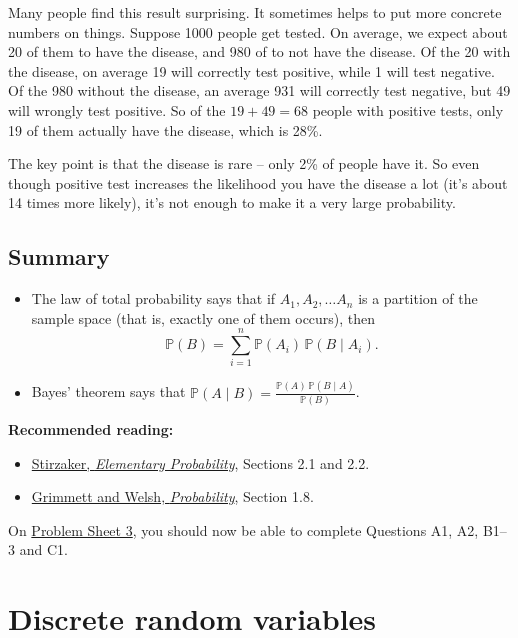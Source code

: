 \documentclass[
  a4paper,
]{book}
\providecommand{\tightlist}{%
  \setlength{\itemsep}{0pt}\setlength{\parskip}{0pt}}
\theoremstyle{definition}
\theoremstyle{definition}
\theoremstyle{definition}
\theoremstyle{definition}
\theoremstyle{remark}
\begin{document}
Many people find this result surprising. It sometimes helps to put more concrete numbers on things. Suppose 1000 people get tested. On average, we expect about 20 of them to have the disease, and 980 of to not have the disease. Of the 20 with the disease, on average 19 will correctly test positive, while 1 will test negative. Of the 980 without the disease, an average 931 will correctly test negative, but 49 will wrongly test positive. So of the \(19+49 = 68\) people with positive tests, only 19 of them actually have the disease, which is 28\%.

The key point is that the disease is rare -- only 2\% of people have it. So even though positive test increases the likelihood you have the disease a lot (it's about 14 times more likely), it's not enough to make it a very large probability.

\hypertarget{summary-L08}{%
\section*{Summary}\label{summary-L08}}

\begin{itemize}
\tightlist
\item
  The law of total probability says that if \(A_1, A_2, \dots A_n\) is a partition of the sample space (that is, exactly one of them occurs), then
  \[ \mathbb P(B) = \sum_{i=1}^n \mathbb P(A_i) \, \mathbb P(B \mid A_i) . \]
\item
  Bayes' theorem says that \({\displaystyle \mathbb P(A \mid B) = \frac{\mathbb P(A) \,\mathbb P(B \mid A)}{\mathbb P(B)} }\).
\end{itemize}

\textbf{Recommended reading:}

\begin{itemize}
\tightlist
\item
  \href{https://leeds.primo.exlibrisgroup.com/permalink/44LEE_INST/13rlbcs/alma991013131349705181}{Stirzaker, \emph{Elementary Probability}}, Sections 2.1 and 2.2.
\item
  \href{https://leeds.primo.exlibrisgroup.com/permalink/44LEE_INST/13rlbcs/alma991002938669705181}{Grimmett and Welsh, \emph{Probability}}, Section 1.8.
\end{itemize}

On \protect\hyperlink{P3}{Problem Sheet 3}, you should now be able to complete Questions A1, A2, B1--3 and C1.

\hypertarget{L09-discrete-rv}{%
\chapter{Discrete random variables}\label{L09-discrete-rv}}
\end{document}
